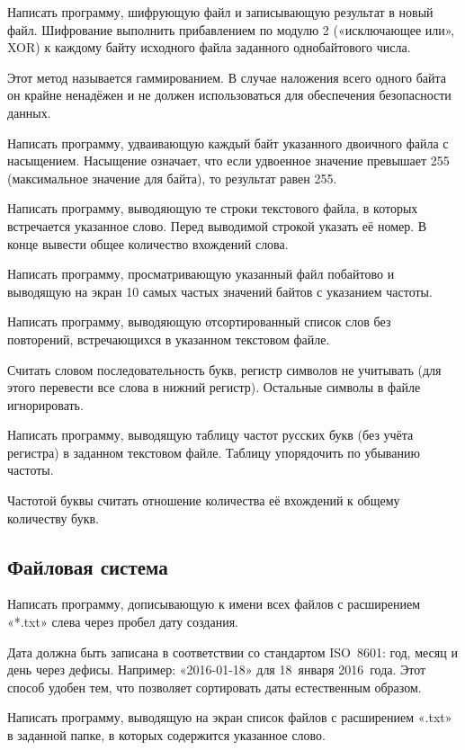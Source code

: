 \task Написать программу, шифрующую файл и записывающую результат в
новый файл. Шифрование выполнить прибавлением по модулю 2
(«исключающее или», XOR) к каждому байту исходного файла заданного
однобайтового числа.

Этот метод называется гаммированием. В случае наложения всего одного
байта он крайне ненадёжен и не должен использоваться для обеспечения
безопасности данных.

\task Написать программу, удваивающую каждый байт указанного двоичного
файла с насыщением. Насыщение означает, что если удвоенное значение
превышает 255 (максимальное значение для байта), то результат равен
255.

\task Написать программу, выводяющую те строки текстового файла, в
которых встречается указанное слово. Перед выводимой строкой указать
её номер. В конце вывести общее количество вхождений слова.

\task Написать программу, просматривающую указанный файл побайтово и
выводящую на экран 10 самых частых значений байтов с указанием
частоты.

\task Написать программу, выводяющую отсортированный список слов без
повторений, встречающихся в указанном текстовом файле.

Считать словом последовательность букв, регистр символов не учитывать
(для этого перевести все слова в нижний регистр). Остальные символы в
файле игнорировать.

\task Написать программу, выводящую таблицу частот русских букв (без
учёта регистра) в заданном текстовом файле. Таблицу упорядочить по
убыванию частоты.

Частотой буквы считать отношение количества её вхождений к общему
количеству букв.


\subsection{Файловая система}

\task Написать программу, дописывающую к имени всех файлов с
расширением «*.txt» слева через пробел дату создания.

Дата должна быть записана в соответствии со стандартом ISO~8601: год,
месяц и день через дефисы. Например: «2016-01-18» для 18~января
2016~года. Этот способ удобен тем, что позволяет сортировать даты
естественным образом.

\task Написать программу, выводящую на экран список файлов с
расширением «.txt» в заданной папке, в которых содержится указанное
слово.

